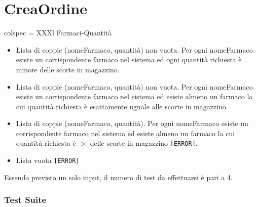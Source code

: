 \section{CreaOrdine}

\begin{table}[H]
	\centering
	\footnotesize
	\begin{partest}{colspec = XXXl}
		Farmaci-Quantità \\
		\begin{itemize}[leftmargin=*]
			\item Lista di coppie (nomeFarmaco, quantità) non vuota. Per ogni nomeFarmaco esiste un corrispondente farmaco nel sistema ed ogni quantità richiesta è minore delle scorte in magazzino.
			\item Lista di coppie (nomeFarmaco, quantità) non vuota. Per ogni nomeFarmaco esiste un corrispondente farmaco nel sistema ed esiste almeno un farmaco la cui quantità richiesta è esattamente uguale alle scorte in magazzino.
			\item Lista di coppie (nomeFarmaco, quantità). Per ogni nomeFarmaco esiste un corrispondente farmaco nel sistema ed esiste almeno un farmaco la cui quantità richiesta è $>$ delle scorte in magazzino \texttt{[ERROR]}.
			\item Lista vuota \texttt{[ERROR]}
		\end{itemize}
	\end{partest}
\end{table}

\noindent Essendo previsto un solo input, il numero di test da effettuarsi è pari a 4.

\subsubsection*{Test Suite}

